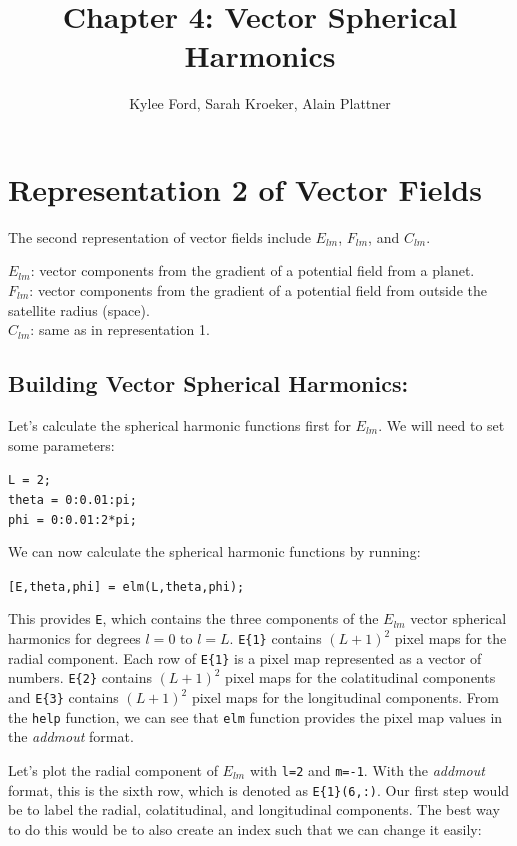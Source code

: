 \documentclass[11pt]{article}
\title{Chapter 4: Vector Spherical Harmonics}
\author{Kylee Ford, Sarah Kroeker, Alain Plattner}
\begin{document}
\maketitle

\section{Representation 2 of Vector Fields}

The second representation of vector fields include $E_{lm}$, $F_{lm}$, and $C_{lm}$.

$E_{lm}$: vector components from the gradient of a potential field from a planet. \\
$F_{lm}$: vector components from the gradient of a potential field from outside the satellite radius (space). \\
$C_{lm}$: same as in representation 1.

\subsection{Building Vector Spherical Harmonics:} 
Let's calculate the spherical harmonic functions first for $E_{lm}$.  We will need to set some parameters:

\verb|L = 2;|\\
\verb|theta = 0:0.01:pi;|\\
\verb|phi = 0:0.01:2*pi;|

We can now calculate the spherical harmonic functions by running:

\verb|[E,theta,phi] = elm(L,theta,phi);|

This provides \verb|E|, which contains the three components of the $E_{lm}$ vector spherical harmonics for degrees $l=0$ to $l=L$.   \verb|E{1}| contains $(L+1)^2$ pixel maps for the radial component.  Each row of \verb|E{1}| is a pixel map represented as a vector of numbers.  \verb|E{2}| contains $(L+1)^2$ pixel maps for the colatitudinal components and \verb|E{3}| contains $(L+1)^2$ pixel maps for the longitudinal components.  From the \verb|help| function, we can see that \verb|elm| function provides the pixel map values in the \textit{addmout} format.  

Let's plot the radial component of $E_{lm}$ with \verb|l=2| and \verb|m=-1|.  With the \textit{addmout} format, this is the sixth row, which is denoted as \verb|E{1}(6,:)|.  Our first step would be to label the radial, colatitudinal, and longitudinal components.  The best way to do this would be to also create an index such that we can change it easily:
\end{document}
